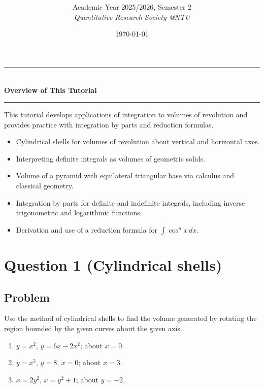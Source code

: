 \documentclass[12pt]{article}
\title{
\CourseCode \CourseName \\[0.3em]
\large \DocType
}
\author{
  Academic Year 2025/2026, Semester 2 \\[0.25em]
  \textit{Quantitative Research Society @NTU}
}
\date{\today}
\begin{document}
\maketitle
\thispagestyle{plainfirst}
\pagestyle{main}

\bigskip


\begin{center}
\rule{0.8\textwidth}{0.4pt}\\[4pt]
\textbf{Overview of This Tutorial}\\[2pt]
\rule{0.8\textwidth}{0.4pt}
\end{center}

\noindent
This tutorial develops applications of integration to volumes of revolution and provides practice with integration by parts and reduction formulas.

\begin{itemize}[leftmargin=*]
\item Cylindrical shells for volumes of revolution about vertical and horizontal axes.
\item Interpreting definite integrals as volumes of geometric solids.
\item Volume of a pyramid with equilateral triangular base via calculus and classical geometry.
\item Integration by parts for definite and indefinite integrals, including inverse trigonometric and logarithmic functions.
\item Derivation and use of a reduction formula for \(\displaystyle \int \cos^n x\,dx\).
\end{itemize}

\bigskip

\newpage


\section*{Question 1 (Cylindrical shells)}

\subsection*{Problem}
Use the method of cylindrical shells to find the volume generated by rotating the region bounded by the given curves about the given axis.
\begin{enumerate}[label=(\alph*)]
\item \(y = x^{2}\), \(y = 6x - 2x^{2}\); about \(x = 0\).
\item \(y = x^{3}\), \(y = 8\), \(x = 0\); about \(x = 3\).
\item \(x = 2y^{2}\), \(x = y^{2} + 1\); about \(y = -2\).
\end{enumerate}
\end{document}
